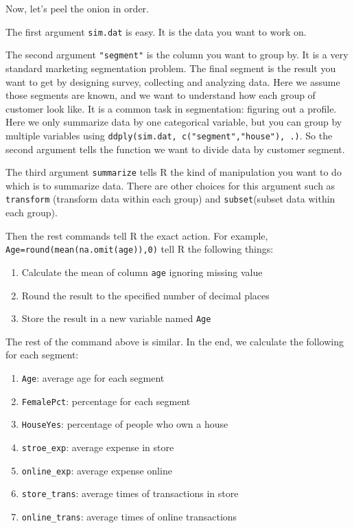 \documentclass[]{book}
\providecommand{\tightlist}{%
  \setlength{\itemsep}{0pt}\setlength{\parskip}{0pt}}
\theoremstyle{definition}
\theoremstyle{definition}
\theoremstyle{remark}
\begin{document}
Now, let's peel the onion in order.

The first argument \texttt{sim.dat} is easy. It is the data you want to
work on.

The second argument \texttt{"segment"} is the column you want to group
by. It is a very standard marketing segmentation problem. The final
segment is the result you want to get by designing survey, collecting
and analyzing data. Here we assume those segments are known, and we want
to understand how each group of customer look like. It is a common task
in segmentation: figuring out a profile. Here we only summarize data by
one categorical variable, but you can group by multiple variables using
\texttt{ddply(sim.dat,\ c("segment","house"),\ .)}. So the second
argument tells the function we want to divide data by customer segment.

The third argument \texttt{summarize} tells R the kind of manipulation
you want to do which is to summarize data. There are other choices for
this argument such as \texttt{transform} (transform data within each
group) and \texttt{subset}(subset data within each group).

Then the rest commands tell R the exact action. For example,
\texttt{Age=round(mean(na.omit(age)),0)} tell R the following things:

\begin{enumerate}
\def\labelenumi{\arabic{enumi}.}
\tightlist
\item
  Calculate the mean of column \texttt{age} ignoring missing value
\item
  Round the result to the specified number of decimal places
\item
  Store the result in a new variable named \texttt{Age}
\end{enumerate}

The rest of the command above is similar. In the end, we calculate the
following for each segment:

\begin{enumerate}
\def\labelenumi{\arabic{enumi}.}
\tightlist
\item
  \texttt{Age}: average age for each segment
\item
  \texttt{FemalePct}: percentage for each segment
\item
  \texttt{HouseYes}: percentage of people who own a house
\item
  \texttt{stroe\_exp}: average expense in store
\item
  \texttt{online\_exp}: average expense online
\item
  \texttt{store\_trans}: average times of transactions in store
\item
  \texttt{online\_trans}: average times of online transactions
\end{enumerate}
\end{document}
